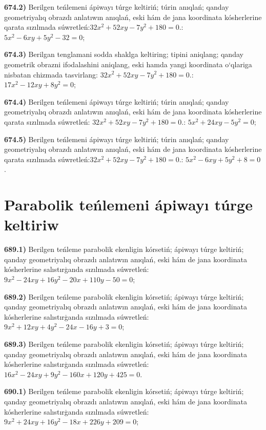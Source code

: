 {\textbf{674.2)} Berilgen teńlemeni ápiwayı túrge keltiriń; túrin anıqlań; qanday geometriyalıq obrazdı anlatıwın anıqlań, eski hám de jana koordinata kósherlerine qarata sızılmada súwretleń:$32x^2+52xy-7y^2+180=0$.: $5 x^2-6 x y+5 y^2-32=0$;

\textbf{674.3)} Berilgan tenglamani sodda shaklga keltiring; tipini aniqlang; qanday geometrik obrazni ifodalashini aniqlang, eski hamda yangi koordinata o‘qlariga nisbatan chizmada tasvirlang: $32x^2+52xy-7y^2+180=0$.: $17 x^2-12 x y+8 y^2=0$;

\textbf{674.4)} Berilgen teńlemeni ápiwayı túrge keltiriń; túrin anıqlań; qanday geometriyalıq obrazdı anlatıwın anıqlań, eski hám de jana koordinata kósherlerine qarata sızılmada súwretleń: $32x^2+52xy-7y^2+180=0$.: $5 x^2+24 x y-5 y^2=0$;

\textbf{674.5)} Berilgen teńlemeni ápiwayı túrge keltiriń; túrin anıqlań; qanday geometriyalıq obrazdı anlatıwın anıqlań, eski hám de jana koordinata kósherlerine qarata sızılmada súwretleń:$32x^2+52xy-7y^2+180=0$.: $5 x^2-6 x y+5 y^2+8=0$.



\section{ Parabolik teńlemeni ápiwayı túrge keltiriw}



\textbf{689.1)} Berilgen teńleme parabolik ekenligin kórsetiń; ápiwayı túrge keltiriń; qanday geometriyalıq obrazdı anlatıwın anıqlań, eski hám de jana koordinata kósherlerine salıstırģanda sızılmada súwretleń:$9 x^2-24 x y+16 y^2-20 x+110 y-50=0$;

\textbf{689.2)} Berilgen teńleme parabolik ekenligin kórsetiń; ápiwayı túrge keltiriń; qanday geometriyalıq obrazdı anlatıwın anıqlań, eski hám de jana koordinata kósherlerine salıstırģanda sızılmada súwretleń:$9 x^2+12 x y+4 y^2-24 x-16 y+3=0$;

\textbf{689.3)} Berilgen teńleme parabolik ekenligin kórsetiń; ápiwayı túrge keltiriń; qanday geometriyalıq obrazdı anlatıwın anıqlań, eski hám de jana koordinata kósherlerine salıstırģanda sızılmada súwretleń:$16 x^2-24 x y+9 y^2-160 x+120 y+425=0$.

\textbf{690.1)} Berilgen teńleme parabolik ekenligin kórsetiń; ápiwayı túrge keltiriń; qanday geometriyalıq obrazdı anlatıwın anıqlań, eski hám de jana koordinata kósherlerine salıstırģanda sızılmada súwretleń: $9 x^2+24 x y+16 y^2-18 x+226 y+209=0$;

}
